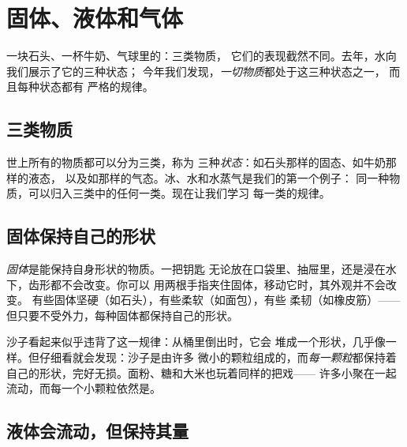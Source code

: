 \chapter{固体、液体和气体}\label{ch:g3:solids-liquids-gases}

一块石头、一杯牛奶、气球里的：三类物质，
它们的表现截然不同。去年，水向我们展示了它的三种状态；
今年我们发现，\emph{一切物质}都处于这三种状态之一，
而且每种状态都有
严格的规律。

\section{三类物质}

世上所有的物质都可以分为三类，称为
三种\emph{状态}：如石头那样的固态、如牛奶那样的液态，
以及如那样的气态。冰、水和水蒸气是我们的第一个例子：
同一种物质，可以归入三类中的任何一类。现在让我们学习
每一类的规律。

\section{固体保持自己的形状}

\begin{definition}[固体]\label{def:g3:solids-liquids-gases:solid}
\emph{固体}是能保持自身形状的物质。一把钥匙
无论放在口袋里、抽屉里，还是浸在水下，齿形都不会改变。你可以
用两根手指夹住固体，移动它时，其外观并不会改变。
有些固体坚硬（如石头），有些柔软（如面包），有些
柔韧（如橡皮筋）——但只要不受外力，每种固体都保持自己的形状。
\end{definition}

\begin{example}[由颗粒组成的固体]\label{ex:g3:solids-liquids-gases:sand}
沙子看起来似乎违背了这一规律：从桶里倒出时，它会
堆成一个形状，几乎像一样。但仔细看就会发现：沙子是由许多
微小的颗粒组成的，而\emph{每一颗粒}都保持着
自己的形状，完好无损。面粉、糖和大米也玩着同样的把戏——
许多小聚在一起流动，而每一个小颗粒依然是。
\end{example}

\section{液体会流动，但保持其量}

